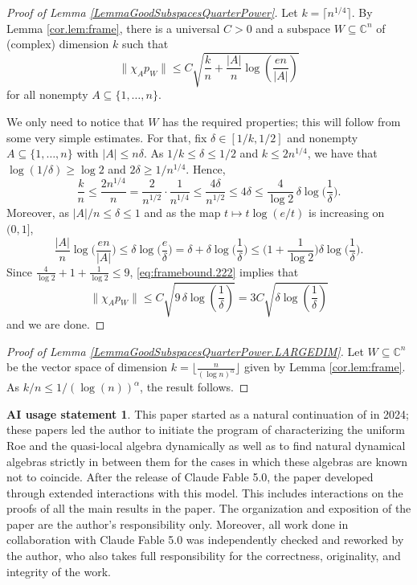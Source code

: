 \documentclass[11pt]{amsart}
\newcommand{\C}{\mathbb{C}}
\numberwithin{equation}{section}
\theoremstyle{definition}
\newtheorem*{AIusage}{AI usage statement}
\theoremstyle{remark}
\begin{document}
\begin{proof}
    [Proof of Lemma \ref{LemmaGoodSubspacesQuarterPower}]
 Let $k=\lceil n^{1/4}\rceil$. By Lemma \ref{cor.lem:frame}, there is a universal $C>0$ and  a subspace $W\subseteq \C^n$ of (complex) dimension $k$ such that \begin{equation}\label{eq:framebound.222}
\|\chi_Ap_W\|\leq C\sqrt{\frac kn+\frac{|A|}{n}\log\left(\frac{en}{|A|}\right)}
\end{equation}
for all nonempty $A\subseteq\{1,\dots,n\}$.

We only need to notice that $W$ has the required properties; this will follow from  some very simple estimates. For that, fix $\delta\in[1/k,1/2]$ and nonempty $A\subseteq\{1,\dots,n\}$ with $|A|\leq n\delta$. As $1/k\leq \delta\leq 1/2$ and $k\leq 2n^{1/4}$, we have that $\log(1/\delta)\geq\log2$ and $2\delta\geq1/n^{1/4}$. Hence,  
\[
\frac kn\leq\frac{2n^{1/4}}{n}=\frac{2}{n^{1/2}}\cdot\frac{1}{n^{1/4}}\leq\frac{4\delta}{n^{1/2}}\leq4\delta\leq\frac{4}{\log2}\,\delta\log\Big(\frac1\delta\Big).
\]
Moreover, as $|A|/n\leq\delta\leq1$ and as the map $t\mapsto t\log(e/t)$ is increasing on $(0,1]$,
\[
\frac{|A|}{n}\log\Big(\frac{en}{|A|}\Big)\leq\delta\log\Big(\frac e\delta\Big)=\delta+\delta\log\Big(\frac1\delta\Big)\leq\Big(1+\frac1{\log2}\Big)\delta\log\Big(\frac1\delta\Big).
\]
Since $\frac4{\log2}+1+\frac1{\log2}\leq9$, \eqref{eq:framebound.222} implies that  \[\|\chi_Ap_W\|\leq C\sqrt{9\,\delta\log\left(\frac{1}{\delta}\right)}=3C\sqrt{\delta\log\left(\frac{1}{\delta}\right)}\]
and we are done.
\end{proof}


\begin{proof}[Proof of Lemma \ref{LemmaGoodSubspacesQuarterPower.LARGEDIM}]
Let $W\subseteq \C^n$ be the vector space of dimension  $k=\lfloor\tfrac{n}{(\log{n})^\alpha}\rfloor$ given  by    Lemma \ref{cor.lem:frame}. As $k/n\leq 1/(\log(n))^\alpha$, the result follows.
\end{proof}


\begin{AIusage}
This paper started as a natural continuation of \cite{BragaExel2023,BragaBussExel2026Jussieu}   in  2024; these papers led the author to initiate the program of  characterizing the  uniform Roe and the quasi-local algebra dynamically as well as to  find natural dynamical algebras strictly in between them for the cases in which these algebras are known not to coincide. After the release of Claude Fable 5.0, the paper developed through     extended interactions with this model. This includes interactions on  the proofs of all the main results in the paper.  The organization and exposition of the paper are the author's responsibility only. Moreover, all work done in collaboration with Claude Fable 5.0 was independently checked and reworked by the author,   who also takes full responsibility for the correctness, originality, and integrity of the work. 
\end{AIusage}
\end{document}
